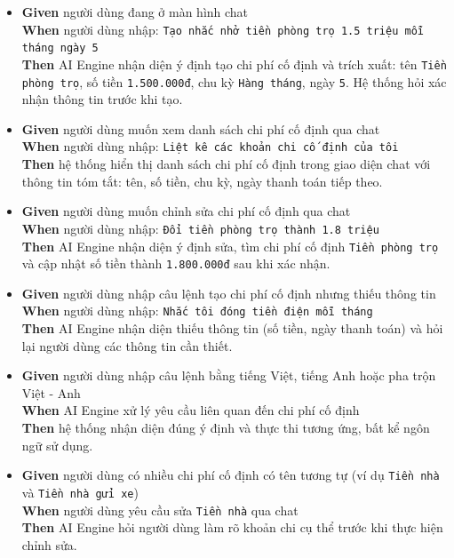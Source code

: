 \begin{itemize}
\item \textbf{Given} người dùng đang ở màn hình chat  \\ \hspace*{1.5em}  \textbf{When} người dùng nhập: \texttt{Tạo nhắc nhở tiền phòng trọ 1.5 triệu mỗi tháng ngày 5}  \\ \hspace*{1.5em}  \textbf{Then} AI Engine nhận diện ý định tạo chi phí cố định và trích xuất: tên \texttt{Tiền phòng trọ}, số tiền \texttt{1.500.000đ}, chu kỳ \texttt{Hàng tháng}, ngày \texttt{5}. Hệ thống hỏi xác nhận thông tin trước khi tạo.
\item \textbf{Given} người dùng muốn xem danh sách chi phí cố định qua chat  \\ \hspace*{1.5em}  \textbf{When} người dùng nhập: \texttt{Liệt kê các khoản chi cố định của tôi}  \\ \hspace*{1.5em}  \textbf{Then} hệ thống hiển thị danh sách chi phí cố định trong giao diện chat với thông tin tóm tắt: tên, số tiền, chu kỳ, ngày thanh toán tiếp theo.
\item \textbf{Given} người dùng muốn chỉnh sửa chi phí cố định qua chat  \\ \hspace*{1.5em}  \textbf{When} người dùng nhập: \texttt{Đổi tiền phòng trọ thành 1.8 triệu}  \\ \hspace*{1.5em}  \textbf{Then} AI Engine nhận diện ý định sửa, tìm chi phí cố định \texttt{Tiền phòng trọ} và cập nhật số tiền thành \texttt{1.800.000đ} sau khi xác nhận.
\item \textbf{Given} người dùng nhập câu lệnh tạo chi phí cố định nhưng thiếu thông tin  \\ \hspace*{1.5em}  \textbf{When} người dùng nhập: \texttt{Nhắc tôi đóng tiền điện mỗi tháng}  \\ \hspace*{1.5em}  \textbf{Then} AI Engine nhận diện thiếu thông tin (số tiền, ngày thanh toán) và hỏi lại người dùng các thông tin cần thiết.
\item \textbf{Given} người dùng nhập câu lệnh bằng tiếng Việt, tiếng Anh hoặc pha trộn Việt - Anh  \\ \hspace*{1.5em}  \textbf{When} AI Engine xử lý yêu cầu liên quan đến chi phí cố định  \\ \hspace*{1.5em}  \textbf{Then} hệ thống nhận diện đúng ý định và thực thi tương ứng, bất kể ngôn ngữ sử dụng.
\item \textbf{Given} người dùng có nhiều chi phí cố định có tên tương tự (ví dụ \texttt{Tiền nhà} và \texttt{Tiền nhà gửi xe})  \\ \hspace*{1.5em}  \textbf{When} người dùng yêu cầu sửa \texttt{Tiền nhà} qua chat  \\ \hspace*{1.5em}  \textbf{Then} AI Engine hỏi người dùng làm rõ khoản chi cụ thể trước khi thực hiện chỉnh sửa.
\end{itemize}
